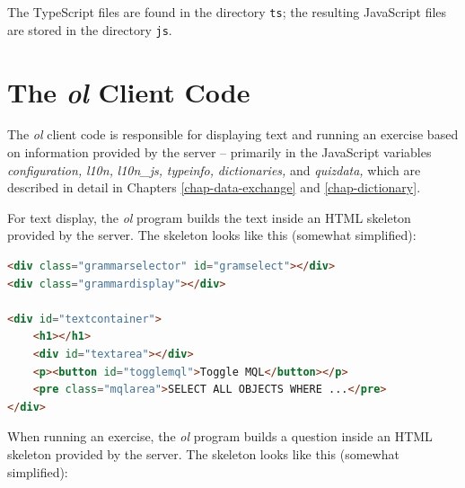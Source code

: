 \documentclass[11pt,oneside,a4paper]{memoir}
\begin{document}
The TypeScript files are found in the directory \texttt{ts}; the resulting JavaScript files are
stored in the directory \texttt{js}.

\section{The \emph{ol} Client Code}\label{sec-ol}

The \emph{ol} client code is responsible for displaying text and running an exercise based on
information provided by the server -- primarily in the JavaScript variables \emph{configuration,}%
\emph{l10n,}%
\emph{l10n\_js,}%
\emph{typeinfo,}%
\emph{dictionaries,}%
and \emph{quizdata,}%
which are described in detail in Chapters \ref{chap-data-exchange} and \ref{chap-dictionary}.

For text display, the \emph{ol} program builds the text inside an HTML skeleton provided by the
server. The skeleton looks like this (somewhat simplified):


\begin{lstlisting}[language=HTML]
<div class="grammarselector" id="gramselect"></div>
<div class="grammardisplay"></div>

<div id="textcontainer">
    <h1></h1>
    <div id="textarea"></div>
    <p><button id="togglemql">Toggle MQL</button></p>
    <pre class="mqlarea">SELECT ALL OBJECTS WHERE ...</pre>
</div>
\end{lstlisting}

When running an exercise, the \emph{ol} program builds a question inside an HTML skeleton provided by the
server. The skeleton looks like this (somewhat simplified):
\end{document}
